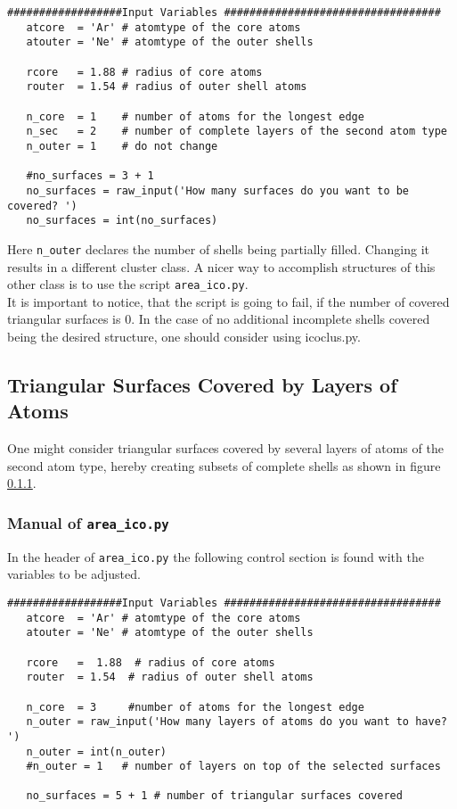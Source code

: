 \begin{lstlisting}
##################Input Variables ##################################
   atcore  = 'Ar' # atomtype of the core atoms
   atouter = 'Ne' # atomtype of the outer shells
   
   rcore   = 1.88 # radius of core atoms
   router  = 1.54 # radius of outer shell atoms
   
   n_core  = 1    # number of atoms for the longest edge
   n_sec   = 2    # number of complete layers of the second atom type
   n_outer = 1    # do not change
   
   #no_surfaces = 3 + 1
   no_surfaces = raw_input('How many surfaces do you want to be covered? ')
   no_surfaces = int(no_surfaces)
\end{lstlisting}
Here \lstinline|n_outer| declares the number of shells being
partially filled. Changing it results in a different cluster class.
A nicer way to accomplish structures of this other class is to use the
script \lstinline|area_ico.py|.\\
It is important to notice, that the script is going to fail,
if the number of covered triangular surfaces is 0. In the case of
no additional incomplete shells covered being the desired structure,
one should consider using icoclus.py.


\subsection{Triangular Surfaces Covered by Layers of Atoms}
One might consider triangular surfaces covered by several layers of
atoms of the second atom type, hereby creating subsets of complete
shells as shown in figure \ref{}.

\subsubsection{Manual of \lstinline|area_ico.py|}
In the header of \lstinline|area_ico.py| the following control section
is found with the variables to be adjusted.

\begin{lstlisting}
##################Input Variables ##################################
   atcore  = 'Ar' # atomtype of the core atoms
   atouter = 'Ne' # atomtype of the outer shells
   
   rcore   =  1.88  # radius of core atoms
   router  = 1.54  # radius of outer shell atoms
   
   n_core  = 3     #number of atoms for the longest edge
   n_outer = raw_input('How many layers of atoms do you want to have? ')
   n_outer = int(n_outer)
   #n_outer = 1   # number of layers on top of the selected surfaces
   
   no_surfaces = 5 + 1 # number of triangular surfaces covered
\end{lstlisting}


